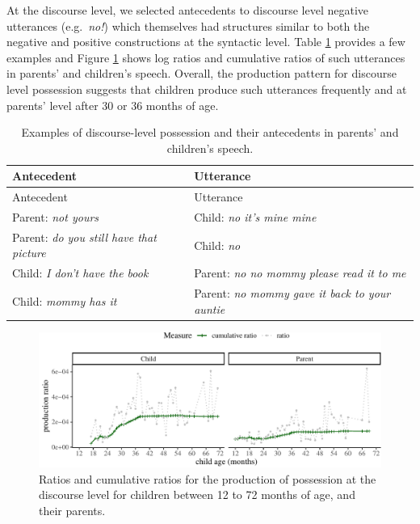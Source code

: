 \documentclass[
  english,
  man,floatsintext]{apa6}
\begin{document}
At the discourse level, we selected antecedents to discourse level negative utterances (e.g.~\emph{no!}) which themselves had structures similar to both the negative and positive constructions at the syntactic level. Table \ref{tab:dispossess} provides a few examples and Figure \ref{fig:possessiondiscourse} shows log ratios and cumulative ratios of such utterances in parents' and children's speech. Overall, the production pattern for discourse level possession suggests that children produce such utterances frequently and at parents' level after 30 or 36 months of age.

\begin{longtable}[]{@{}ll@{}}
\caption{\label{tab:dispossess} Examples of discourse-level possession and their antecedents in parents' and children's speech.}\tabularnewline
\toprule
Antecedent & Utterance \\
\midrule
\endfirsthead
\toprule
Antecedent & Utterance \\
\midrule
\endhead
Parent: \emph{not yours} & Child: \emph{no it's mine mine} \\
Parent: \emph{do you still have that picture} & Child: \emph{no} \\
Child: \emph{I don't have the book} & Parent: \emph{no no mommy please read it to me} \\
Child: \emph{mommy has it} & Parent: \emph{no mommy gave it back to your auntie} \\
\bottomrule
\end{longtable}

\begin{figure}[H]

{\centering \includegraphics{neg_construction_article_files/figure-latex/possessiondiscourse-1} 

}

\caption{Ratios and cumulative ratios for the production of possession at the discourse level for children between 12 to 72 months of age, and their parents.}\label{fig:possessiondiscourse}
\end{figure}
\end{document}
